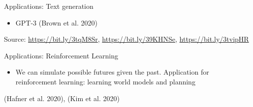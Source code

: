 \begin{frame}{Applications: Text generation}
\protect\hypertarget{applications-text-generation}{}

\begin{itemize}
\tightlist
\item
  GPT-3 (Brown et al. 2020)
\end{itemize}


Source: \url{https://bit.ly/3tqM8Sr}, \url{https://bit.ly/39KHNSe},
\url{https://bit.ly/3tvipHR}

\end{frame}

\begin{frame}{Applications: Reinforcement Learning}
\protect\hypertarget{applications-reinforcement-learning}{}

\begin{itemize}
\tightlist
\item
  We can simulate possible futures given the past. Application for
  reinforcement learning: learning world models and planning
\end{itemize}


(Hafner et al. 2020), (Kim et al. 2020)

\end{frame}

